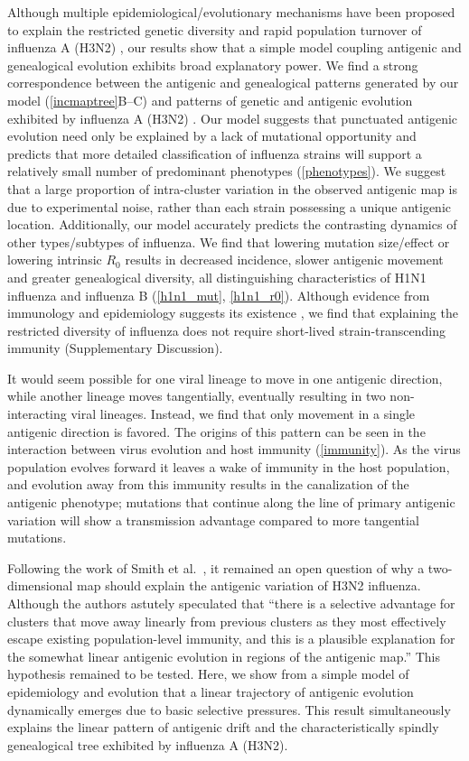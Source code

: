 Although multiple epidemiological/evolutionary mechanisms have been proposed to explain the restricted genetic diversity and rapid population turnover of influenza A (H3N2) \cite{Ferguson03,Tria05,Koelle06,Recker07}, our results show that a simple model coupling antigenic and genealogical evolution exhibits broad explanatory power.  We find a strong correspondence between the antigenic and genealogical patterns generated by our model (\ref{incmaptree}B--C) and patterns of genetic and antigenic evolution exhibited by influenza A (H3N2) \cite{Fitch97,Smith04}.  Our model suggests that punctuated antigenic evolution need only be explained by a lack of mutational opportunity and predicts that more detailed classification of influenza strains will support a relatively small number of predominant phenotypes (\ref{phenotypes}).  We suggest that a large proportion of intra-cluster variation in the observed antigenic map is due to experimental noise, rather than each strain possessing a unique antigenic location.  Additionally, our model accurately predicts the contrasting dynamics of other types/subtypes of influenza.  We find that lowering mutation size/effect or lowering intrinsic $R_0$ results in decreased incidence, slower antigenic movement and greater genealogical diversity, all distinguishing characteristics of H1N1 influenza and influenza B (\ref{h1n1_mut}, \ref{h1n1_r0}).  Although evidence from immunology and epidemiology suggests its existence \cite{Ferguson03,Voeten00,Goldstein11}, we find that explaining the restricted diversity of influenza does not require short-lived strain-transcending immunity (Supplementary Discussion).

It would seem possible for one viral lineage to move in one antigenic direction, while another lineage moves tangentially, eventually resulting in two non-interacting viral lineages.  Instead, we find that only movement in a single antigenic direction is favored.  The origins of this pattern can be seen in the interaction between virus evolution and host immunity (\ref{immunity}).  As the virus population evolves forward it leaves a wake of immunity in the host population, and evolution away from this immunity results in the canalization of the antigenic phenotype; mutations that continue along the line of primary antigenic variation will show a transmission advantage compared to more tangential mutations.  

Following the work of Smith et al.\ \cite{Smith04}, it remained an open question of why a two-dimensional map should explain the antigenic variation of H3N2 influenza.  Although the authors astutely speculated that ``there is a selective advantage for clusters that move away linearly from previous clusters as they most effectively escape existing population-level immunity, and this is a plausible explanation for the somewhat linear antigenic evolution in regions of the antigenic map.''  This hypothesis remained to be tested.  Here, we show from a simple model of epidemiology and evolution that a linear trajectory of antigenic evolution dynamically emerges due to basic selective pressures.  This result simultaneously explains the linear pattern of antigenic drift \cite{Smith04} and the characteristically spindly genealogical tree \cite{Fitch97} exhibited by influenza A (H3N2).

